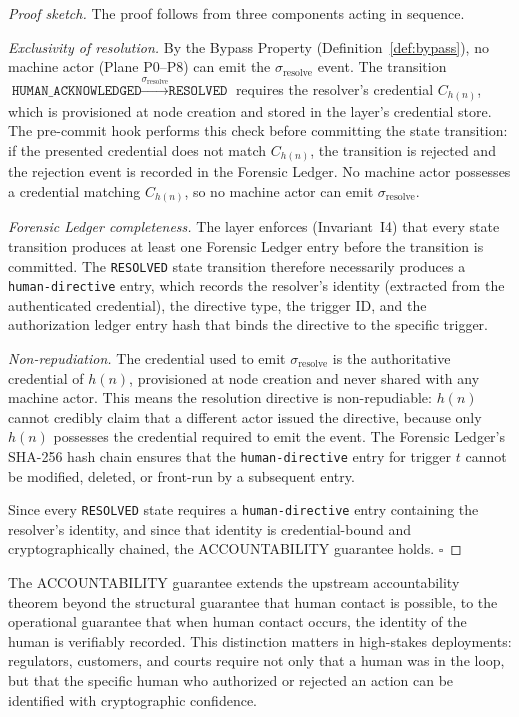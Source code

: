 \begin{proof}[Proof sketch]
The proof follows from three components acting in sequence.

\medskip
\noindent
\textit{Exclusivity of resolution.}  By the Bypass Property
(Definition~\ref{def:bypass}), no machine actor (Plane P0--P8) can emit the
$\sigma_{\text{resolve}}$ event.  The transition
$\texttt{HUMAN\_ACKNOWLEDGED} \xrightarrow{\sigma_{\text{resolve}}}
\texttt{RESOLVED}$ requires the resolver's credential $C_{h(n)}$, which is
provisioned at node creation and stored in the \fact{} layer's credential store.
The pre-commit hook performs this check before committing the state transition:
if the presented credential does not match $C_{h(n)}$, the transition is rejected
and the rejection event is recorded in the Forensic Ledger.  No machine actor
possesses a credential matching $C_{h(n)}$, so no machine actor can emit
$\sigma_{\text{resolve}}$.

\medskip
\noindent
\textit{Forensic Ledger completeness.}  The \fact{} layer enforces
(Invariant~I4) that every state transition produces at least one Forensic Ledger
entry before the transition is committed.  The \texttt{RESOLVED} state
transition therefore necessarily produces a \texttt{human-directive} entry,
which records the resolver's identity (extracted from the authenticated
credential), the directive type, the trigger ID, and the authorization ledger
entry hash that binds the directive to the specific trigger.

\medskip
\noindent
\textit{Non-repudiation.}  The credential used to emit $\sigma_{\text{resolve}}$
is the authoritative credential of $h(n)$, provisioned at node creation and
never shared with any machine actor.  This means the resolution directive is
non-repudiable: $h(n)$ cannot credibly claim that a different actor issued the
directive, because only $h(n)$ possesses the credential required to emit the
event.  The Forensic Ledger's SHA-256 hash chain ensures that the
\texttt{human-directive} entry for trigger $t$ cannot be modified, deleted, or
front-run by a subsequent entry.

Since every \texttt{RESOLVED} state requires a \texttt{human-directive} entry
containing the resolver's identity, and since that identity is credential-bound
and cryptographically chained, the ACCOUNTABILITY guarantee holds.  $\square$
\end{proof}

The ACCOUNTABILITY guarantee extends the upstream accountability theorem beyond
the structural guarantee that human contact is possible, to the operational
guarantee that when human contact occurs, the identity of the human is verifiably
recorded.  This distinction matters in high-stakes deployments: regulators,
customers, and courts require not only that a human was in the loop, but that
the specific human who authorized or rejected an action can be identified with
cryptographic confidence.

